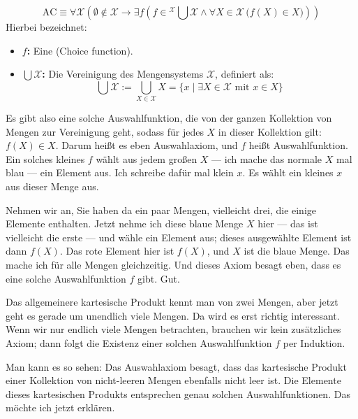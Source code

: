 \begin{math-stroke}
\begin{equation}
\label{eq:ac}
\text{AC} \equiv \forall \mathcal{X} \left( \emptyset \notin \mathcal{X} \rightarrow \exists f \left( f \in {}^{\displaystyle \mathcal{X}}\!\bigcup \mathcal{X} \land \forall X \in \mathcal{X} \, \bigl( f(X) \in X \bigr) \right) \right)
\end{equation}
Hierbei bezeichnet:
\begin{itemize}
    \item \textbf{$f$:} Eine  (Choice function).
    \item \textbf{$\bigcup \mathcal{X}$:} Die Vereinigung des Mengensystems $\mathcal{X}$, definiert als:
    \[
    \bigcup \mathcal{X} := \bigcup_{X \in \mathcal{X}} X = \{ x \mid \exists X \in \mathcal{X} \text{ mit } x \in X \}
    \]
\end{itemize}
\end{math-stroke}

\begin{spoken-clean}[00:14:40 - 00:17:28]
Es gibt also eine solche Auswahlfunktion, die von der ganzen Kollektion von Mengen zur Vereinigung geht, sodass für jedes $X$ in dieser Kollektion gilt: $f(X) \in X$. Darum heißt es eben Auswahlaxiom, und $f$ heißt Auswahlfunktion. Ein solches kleines $f$ wählt aus jedem großen $X$ --- ich mache das normale $X$ mal blau --- ein Element aus. Ich schreibe dafür mal klein $x$. Es wählt ein kleines $x$ aus dieser Menge aus.

Nehmen wir an, Sie haben da ein paar Mengen, vielleicht drei, die einige Elemente enthalten. Jetzt nehme ich diese blaue Menge $X$ hier --- das ist vielleicht die erste --- und wähle ein Element aus; dieses ausgewählte Element ist dann $f(X)$. Das rote Element hier ist $f(X)$, und $X$ ist die blaue Menge. Das mache ich für alle Mengen gleichzeitig. Und dieses Axiom besagt eben, dass es eine solche Auswahlfunktion $f$ gibt. Gut.

Das allgemeinere kartesische Produkt kennt man von zwei Mengen, aber jetzt geht es gerade um unendlich viele Mengen. Da wird es erst richtig interessant. Wenn wir nur endlich viele Mengen betrachten, brauchen wir kein zusätzliches Axiom; dann folgt die Existenz einer solchen Auswahlfunktion $f$ per Induktion.

Man kann es so sehen: Das Auswahlaxiom besagt, dass das kartesische Produkt einer Kollektion von nicht-leeren Mengen ebenfalls nicht leer ist. Die Elemente dieses kartesischen Produkts entsprechen genau solchen Auswahlfunktionen. Das möchte ich jetzt erklären.
\end{spoken-clean}

